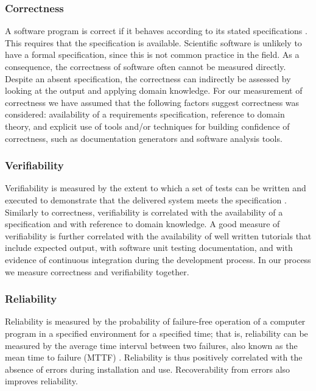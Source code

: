 \documentclass[final, 3p, times, authoryear]{elsarticle}
\begin{document}
\subsubsection{Correctness}

A software program is correct if it behaves according to its stated
specifications \citep{GhezziEtAl2003}. This requires that the specification is
available. Scientific software is unlikely to have a formal specification, since
this is not common practice in the field. As a consequence, the correctness of
software often cannot be measured directly. Despite an absent specification, the
correctness can indirectly be assessed by looking at the output and applying
domain knowledge. For our measurement of correctness we have assumed that the
following factors suggest correctness was considered: availability of a
requirements specification, reference to domain theory, and explicit use of
tools and/or techniques for building confidence of correctness, such as
documentation generators and software analysis tools.

\subsubsection{Verifiability}

Verifiability is measured by the extent to which a set of tests can be written
and executed to demonstrate that the delivered system meets the specification
\citep{sommerville}. Similarly to correctness, verifiability is correlated with
the availability of a specification and with reference to domain knowledge. A
good measure of verifiability is further correlated with the availability of
well written tutorials that include expected output, with software unit testing
documentation, and with evidence of continuous integration during the
development process. In our process we measure correctness and verifiability
together.

\subsubsection{Reliability}

Reliability is measured by the probability of failure-free operation of a
computer program in a specified environment for a specified time; that is,
reliability can be measured by the average time interval between two failures,
also known as the mean time to failure (MTTF) \citep{GhezziEtAl2003}
\citep{musa1987software}. Reliability is thus positively correlated with the
absence of errors during installation and use. Recoverability from errors also
improves reliability.
\end{document}
